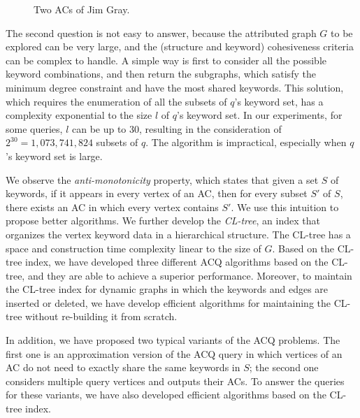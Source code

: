 \begin{figure}[ht]
{{            \label{fig:jim2}
        }
    }
    \caption{Two ACs of Jim Gray.}\label{fig:jim}
\end{figure}

The second question is not easy to answer, because the attributed graph $G$ to be explored can be very large, and the (structure and keyword) cohesiveness criteria can be complex to handle. A simple way is first to consider all the possible keyword combinations, and then return the subgraphs, which satisfy the minimum degree constraint and have the most shared keywords. This solution, which requires the enumeration of all the subsets of $q$'s keyword set, has a complexity exponential to the size $l$ of $q$'s keyword set. In our experiments, for some queries, $l$ can be up to 30, resulting in the consideration of $2^{30}=1,073,741,824$ subsets of $q$. The algorithm is impractical, especially when $q$'s keyword set is large.

{\color{blue}
We observe the {\it anti-monotonicity} property, which states that given a set $S$ of keywords, if it appears in every vertex of an AC, then for every subset $S'$ of $S$, there exists an AC in which every vertex contains $S'$. We use this intuition to propose better algorithms. We further develop the \emph{CL-tree}, an index that organizes the vertex keyword data in a hierarchical structure. The CL-tree has a space and construction time complexity linear to the size of $G$.
Based on the CL-tree index, we have developed three different ACQ algorithms based on the CL-tree, and they are able to achieve a superior performance.
Moreover, to maintain the CL-tree index for dynamic graphs in which the keywords and edges are inserted or deleted, we have develop efficient algorithms for maintaining the CL-tree without re-building it from scratch.

In addition, we have proposed two typical variants of the ACQ problems. The first one is an approximation version of the ACQ query in which vertices of an AC do not need to exactly share the same keywords in $S$;
the second one considers multiple query vertices and outputs their ACs.
To answer the queries for these variants, we have also developed efficient algorithms based on the CL-tree index.
}

